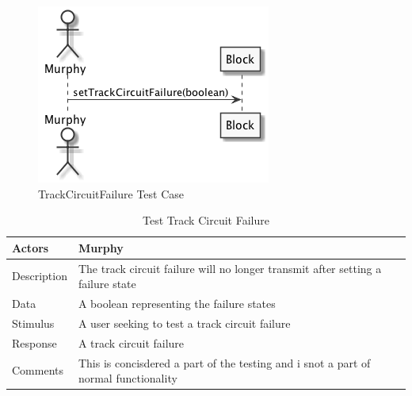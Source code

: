 \documentclass[]{article}
\begin{document}
\begin{figure}[H]
	\centering
	\includegraphics[scale=.5]{trackCircuitFailure.png}
	\caption{TrackCircuitFailure Test Case}
\end{figure}
\begin{table}[H]
	\centering
	\caption{Test Track Circuit Failure}
	\begin{tabular}{|l|l|}
		\hline
		Actors & \parbox[t]{10cm}{Murphy} \\ \hline
		Description & \parbox[t]{10cm}{The track circuit failure will no longer transmit after setting a failure state} \\ \hline
		Data &  \parbox[t]{10cm}{A boolean representing the failure states} \\ \hline
		Stimulus &  \parbox[t]{10cm}{A user seeking to test a track circuit failure} \\ \hline
		Response & \parbox[t]{10cm}{A track circuit failure}\\ \hline
		Comments & \parbox[t]{10cm}{This is concisdered a part of the testing and i snot a part of normal functionality}  \\ \hline
	\end{tabular}
\end{table}
\end{document}
